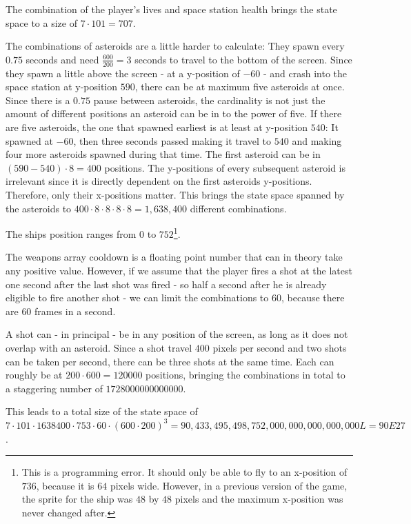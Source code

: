 \documentclass[a4paper,10pt]{article}
\begin{document}
The combination of the player's lives and space station health brings the state space to a size of $7 \cdot 101 = 707$.

The combinations of asteroids are a little harder to calculate: They spawn every $0.75$ seconds and need $\frac{600}{200} = 3$ seconds to travel to the bottom of the screen.
Since they spawn a little above the screen - at a y-position of $-60$ -  and crash into the space station at y-position $590$, there can be at maximum five asteroids at once.
Since there is a $0.75$ pause between asteroids, the cardinality is not just the amount of different positions an asteroid can be in to the power of five.
If there are five asteroids, the one that spawned earliest is at least at y-position $540$: It spawned at $-60$, then three seconds passed making it travel to $540$ and making four more asteroids spawned during that time.
The first asteroid can be in $(590-540)\cdot8 = 400$ positions.
The y-positions of every subsequent asteroid is irrelevant since it is directly dependent on the first asteroids y-positions.
Therefore, only their x-positions matter.
This brings the state space spanned by the asteroids to $400\cdot8\cdot8\cdot8\cdot8 = 1,638,400$ different combinations.

The ships position ranges from $0$ to $752$\footnote{This is a programming error. It should only be able to fly to an x-position of $736$, because it is $64$ pixels wide. However, in a previous version of the game, the sprite for the ship was $48$ by $48$ pixels and the maximum x-position was never changed after.}.

The weapons array cooldown is a floating point number that can in theory take any positive value.
However, if we assume that the player fires a shot at the latest one second after the last shot was fired - so half a second after he is already eligible to fire another shot - we can limit the combinations to $60$, because there are $60$ frames in a second.

A shot can - in principal - be in any position of the screen, as long as it does not overlap with an asteroid.
Since a shot travel $400$ pixels per second and two shots can be taken per second, there can be three shots at the same time.
Each can roughly be at $200 \cdot 600 = 120000$ positions, bringing the combinations in total to a staggering number of $1728000000000000$.

This leads to a total size of the state space of $7\cdot101\cdot1638400\cdot753\cdot60\cdot(600\cdot200)^3 = 90,433,495,498,752,000,000,000,000,000L = 90E27$.
\end{document}
